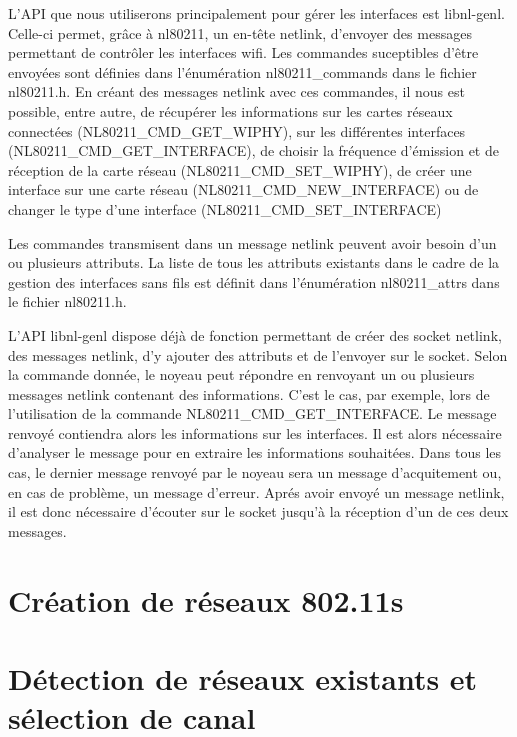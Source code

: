 L'API que nous utiliserons principalement pour gérer les interfaces est libnl-genl. Celle-ci permet, grâce à nl80211, un
en-tête netlink, d'envoyer des messages permettant de contrôler les interfaces wifi. Les commandes suceptibles d'être envoyées
sont définies dans l'énumération nl80211\_commands dans le fichier nl80211.h. En créant des messages netlink avec ces commandes,
il nous est possible, entre autre, de récupérer les informations sur les cartes réseaux connectées (NL80211\_CMD\_GET\_WIPHY),
sur les différentes interfaces (NL80211\_CMD\_GET\_INTERFACE), de choisir la fréquence d'émission et de réception de la
carte réseau (NL80211\_CMD\_SET\_WIPHY), de créer une interface sur une carte réseau (NL80211\_CMD\_NEW\_INTERFACE) ou de 
changer le type d'une interface (NL80211\_CMD\_SET\_INTERFACE)


Les commandes transmisent dans un message netlink peuvent avoir besoin d'un ou plusieurs attributs. La liste de tous les 
attributs existants dans le cadre de la gestion des interfaces sans fils est définit dans l'énumération nl80211\_attrs dans
le fichier nl80211.h.

L'API libnl-genl dispose déjà de fonction permettant de créer des socket netlink, des messages netlink, d'y ajouter des attributs
et de l'envoyer sur le socket. Selon la commande donnée, le noyeau peut répondre en renvoyant un ou plusieurs messages
netlink contenant des informations. C'est le cas, par exemple, lors de l'utilisation de la commande NL80211\_CMD\_GET\_INTERFACE.
Le message renvoyé contiendra alors les informations sur les interfaces. Il est alors nécessaire d'analyser le message pour 
en extraire les informations souhaitées. Dans tous les cas, le dernier message renvoyé par le noyeau sera un message
d'acquitement ou, en cas de problème, un message d'erreur. Aprés avoir envoyé un message netlink, il est donc nécessaire
d'écouter sur le socket jusqu'à la réception d'un de ces deux messages.

\section{Création de réseaux 802.11s}

\section{Détection de réseaux existants et sélection de canal}

